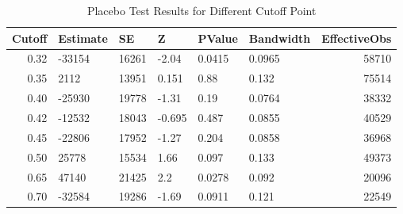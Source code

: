 \begin{table}[ht]
\centering
\caption{Placebo Test Results for Different Cutoff Point} 
\label{tab:movement_cutoff}
\begin{tabular}{rlllllr}
  \hline
Cutoff & Estimate & SE & Z & PValue & Bandwidth & EffectiveObs \\ 
  \hline
0.32 & -33154 & 16261 & -2.04 & 0.0415 & 0.0965 & 58710 \\ 
  0.35 & 2112 & 13951 & 0.151 & 0.88 & 0.132 & 75514 \\ 
  0.40 & -25930 & 19778 & -1.31 & 0.19 & 0.0764 & 38332 \\ 
  0.42 & -12532 & 18043 & -0.695 & 0.487 & 0.0855 & 40529 \\ 
  0.45 & -22806 & 17952 & -1.27 & 0.204 & 0.0858 & 36968 \\ 
  0.50 & 25778 & 15534 & 1.66 & 0.097 & 0.133 & 49373 \\ 
  0.65 & 47140 & 21425 & 2.2 & 0.0278 & 0.092 & 20096 \\ 
  0.70 & -32584 & 19286 & -1.69 & 0.0911 & 0.121 & 22549 \\ 
   \hline
\end{tabular}
\end{table}

